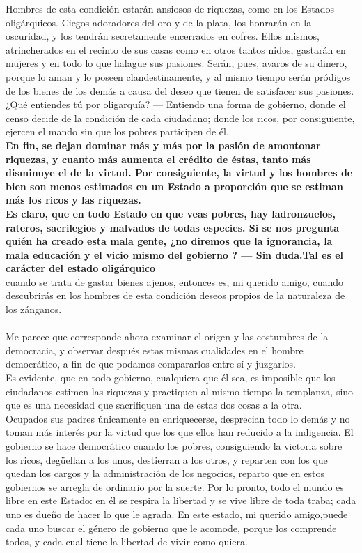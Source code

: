 \documentclass[10pt]{book}
\begin{document}
Hombres de esta condición  estarán  ansiosos de riquezas,  como en los Estados  oligárquicos.  Ciegos  adoradores  del  oro y  de la plata,  los honrarán  en  la  oscuridad,  y  los  tendrán  secretamente  encerrados  en  cofres.  Ellos mismos, atrincherados  en  el recinto  de sus casas como en otros  tantos nidos, gastarán  en  mujeres  y  en  todo lo  que  halague  sus pasiones. Serán,  pues, avaros  de  su  dinero,  porque  lo  aman  y  lo  poseen  clandestinamente,  y   al   mismo   tiempo  serán  pródigos  de  los bienes  de los demás a causa  del  deseo  que  tienen  de satisfacer  sus  pasiones.\\
¿Qué entiendes  tú por  oligarquía?  — Entiendo  una  forma  de gobierno,  donde  el censo decide  de la  condición  de  cada  ciudadano;  donde  los  ricos,  por  consiguiente, ejercen  el mando sin que los pobres  participen  de  él.  \\
\textbf{ En  fin,  se dejan  dominar  más  y más por la  pasión  de  amontonar riquezas,  y  cuanto  más  aumenta  el  crédito  de  éstas,  tanto  más  disminuye  el  de  la  virtud. Por  consiguiente, la virtud  y  los hombres de  bien son menos estimados  en  un  Estado  a  proporción  que  se estiman  más  los ricos  y  las riquezas.}\\
\textbf{Es claro,   que  en   todo  Estado  en  que  veas pobres, hay ladronzuelos,  rateros, sacrilegios y  malvados de todas especies.  Si se  nos pregunta  quién  ha  creado  esta  mala  gente,  ¿no diremos  que  la  ignorancia,  la  mala  educación  y  el vicio mismo del gobierno ? — Sin  duda.Tal es el carácter del estado oligárquico}\\
cuando se trata  de gastar  bienes  ajenos,  entonces  es, mi querido amigo,  cuando descubrirás en los hombres de esta  condición  deseos  propios de la naturaleza  de  los  zánganos. \\\\
Me parece  que  corresponde ahora  examinar el origen y  las costumbres  de  la   democracia,  y  observar  después  estas  mismas cualidades  en  el  hombre  democrático, a fin de que  podamos compararlos  entre  sí y juzgarlos.\\
Es  evidente,  que  en  todo gobierno, cualquiera que  él  sea,  es  imposible  que  los ciudadanos  estimen  las  riquezas  y  practiquen  al  mismo  tiempo  la  templanza,  sino  que  es  una  necesidad  que  sacrifiquen  una  de estas  dos  cosas a la otra. \\
Ocupados sus padres únicamente en enriquecerse, desprecian todo lo demás y no toman más interés por la virtud que los que ellos han reducido a la indigencia. El gobierno se hace democrático cuando los pobres, consiguiendo la victoria sobre los ricos, degüellan a los unos, destierran a los otros, y reparten con los que quedan los cargos y la administración de los negocios, reparto que en estos gobiernos se arregla de ordinario por la suerte. Por lo pronto, todo el mundo es libre en este Estado: en él se respira la libertad y se vive libre de toda traba; cada uno es dueño de hacer lo que le agrada. En este estado, mi querido amigo,puede cada uno buscar el género de gobierno que le acomode, porque los comprende todos, y cada cual tiene la libertad de vivir como quiera.\\
\end{document}

